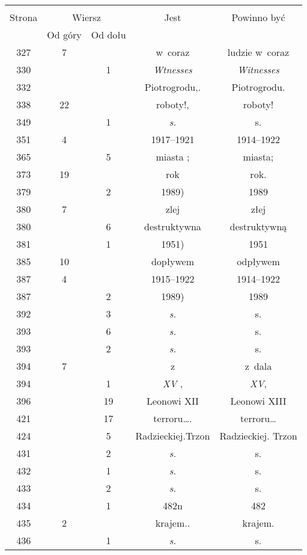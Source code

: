 \documentclass[a4paper,11pt]{article}  %
\newcommand{\ld}{\ldots}
\begin{document}
\begin{center}
  \begin{tabular}{|c|c|c|c|c|}
    \hline
    & \multicolumn{2}{c|}{} & & \\
    Strona & \multicolumn{2}{c|}{Wiersz}& Jest & Powinno być \\ \cline{2-3}
    & Od góry & Od dołu &  &  \\ \hline
    327 &  7 & & w~coraz & ludzie w~coraz \\
    330 & &  1 & \emph{Wtnesses} & \emph{Witnesses} \\
    332 & & & Piotrogrodu,. & Piotrogrodu. \\ %
    338 & 22 & & roboty!, & roboty! \\
    349 & &  1 & \emph{s.} & s. \\
    351 &  4 & & 1917--1921 & 1914--1922 \\
    365 & &  5 & miasta ; & miasta; \\
    373 & 19 & & rok & rok. \\
    379 & &  2 & 1989) & 1989 \\
    380 &  7 & & zlej & złej \\
    380 & &  6 & destruktywna & destruktywną \\
    381 & &  1 & 1951) & 1951 \\
    385 & 10 & & dopływem & odpływem \\
    387 &  4 & & 1915--1922 & 1914--1922 \\
    387 & &  2 & 1989) & 1989 \\
    392 & &  3 & \emph{s.} & s. \\
    393 & &  6 & \emph{s.} & s. \\
    393 & &  2 & \emph{s.} & s. \\
    394 &  7 & & z & z~dala \\
    394 & &  1 & \emph{XV} , & \emph{XV}, \\
    396 & & 19 & Leonowi XII & Leonowi XIII \\
    421 & & 17 & terroru\ld. & terroru\ld \\
    424 & &  5 & Radzieckiej.Trzon & Radzieckiej. Trzon \\
    431 & &  2 & \emph{s.} & s. \\
    432 & &  1 & \emph{s.} & s. \\
    433 & &  2 & \emph{s.} & s. \\
    434 & &  1 & 482n & 482 \\
    435 &  2 & & krajem.. & krajem. \\
    436 & &  1 & \emph{s.} & s. \\

\end{tabular}
\end{center}
\end{document}
